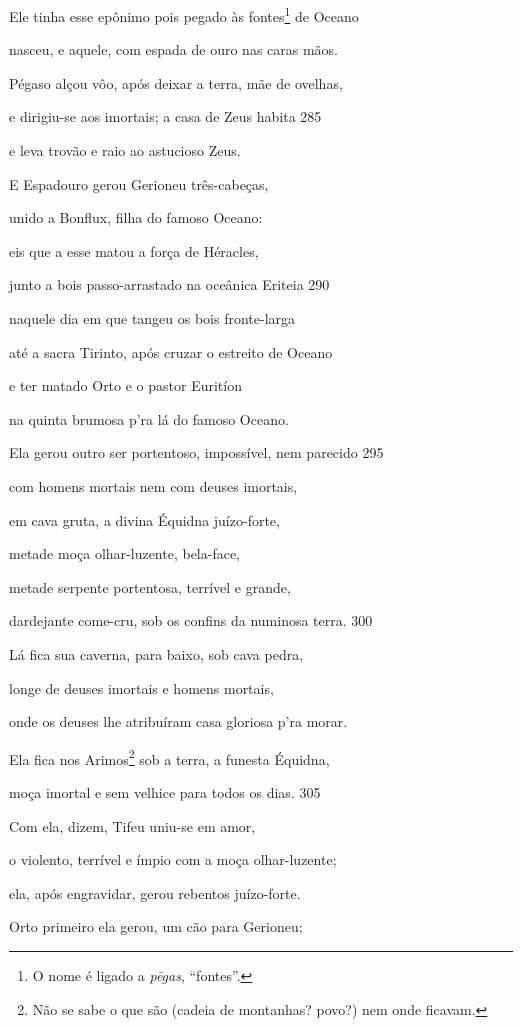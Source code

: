 Ele tinha esse epônimo pois pegado às fontes\footnote{O nome é ligado a \emph{pēgas}, ``fontes''.} de Oceano

nasceu, e aquele, com espada de ouro nas caras mãos.

Pégaso alçou vôo, após deixar a terra, mãe de ovelhas,

e dirigiu-se aos imortais; a casa de Zeus habita \num{285}

e leva trovão e raio ao astucioso Zeus.

E Espadouro gerou Gerioneu três-cabeças,

unido a Bonflux, filha do famoso Oceano:

eis que a esse matou a força de Héracles,

junto a bois passo-arrastado na oceânica Eriteia \num{290}

naquele dia em que tangeu os bois fronte-larga

até a sacra Tirinto, após cruzar o estreito de Oceano

e ter matado Orto e o pastor Euritíon

na quinta brumosa p'ra lá do famoso Oceano.

\quad{}Ela gerou outro ser portentoso, impossível, nem parecido \num{295}

com homens mortais nem com deuses imortais,

em cava gruta, a divina Équidna juízo-forte,

metade moça olhar-luzente, bela-face,

metade serpente portentosa, terrível e grande,

dardejante come-cru, sob os confins da numinosa terra. \num{300}

Lá fica sua caverna, para baixo, sob cava pedra,

longe de deuses imortais e homens mortais,

onde os deuses lhe atribuíram casa gloriosa p'ra morar.

\quad{}Ela fica nos Arimos\footnote{Não se sabe o que são (cadeia de montanhas? povo?) nem onde ficavam.} sob a terra, a funesta Équidna,

moça imortal e sem velhice para todos os dias. \num{305}

Com ela, dizem, Tifeu uniu-se em amor,

o violento, terrível e ímpio com a moça olhar-luzente;

ela, após engravidar, gerou rebentos juízo-forte.

Orto primeiro ela gerou, um cão para Gerioneu;

